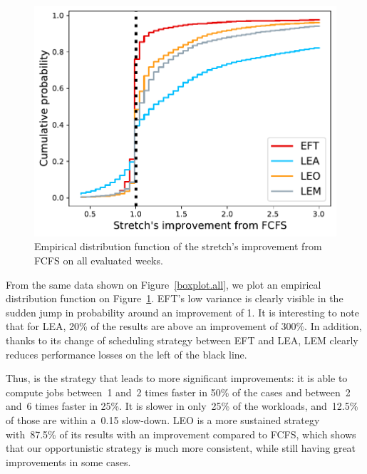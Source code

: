 \documentclass[sigconf,review,anonymous]{acmart}
\newcommand{\rev}[1]{{\color{black}{#1}}}
\begin{document}
\begin{figure}[t]\centering\includegraphics[width=0.9\linewidth]{../MBSS/plot/ECDF/byuser/ecdf_stretch_all-all.pdf}\caption{Empirical distribution function of the stretch's improvement from FCFS on all evaluated weeks.}\label{ecdf}\end{figure}
From the same data shown on Figure~\ref{boxplot.all}, we plot an empirical distribution function on Figure~\ref{ecdf}.
EFT's low variance is clearly visible in the sudden jump in probability around an improvement of 1.
It is interesting to note that for LEA, 20\% of the results are above an improvement of 300\%.
In addition, thanks to its change of scheduling strategy between EFT and LEA, LEM clearly reduces
performance losses on the left of the black line.

Thus, \rev{LEA} is the strategy that leads to more significant improvements: it is able to compute jobs between~1 and~2 times faster in 50\% of the cases and between~2 and~6 times faster in 25\%.
It is slower in only~25\% of the workloads, and~12.5\% of those are within a~0.15 slow-down.
LEO is a more sustained strategy with~87.5\% of its results with an improvement compared to FCFS, which shows that our opportunistic
strategy is much more consistent, while still having great improvements in some cases.
\rev{LEM is more versatile. It leads to an improvement in ~87.5\% of the results, with a speed-up of at least 7.5\% in 50\% of the results.}
\end{document}
